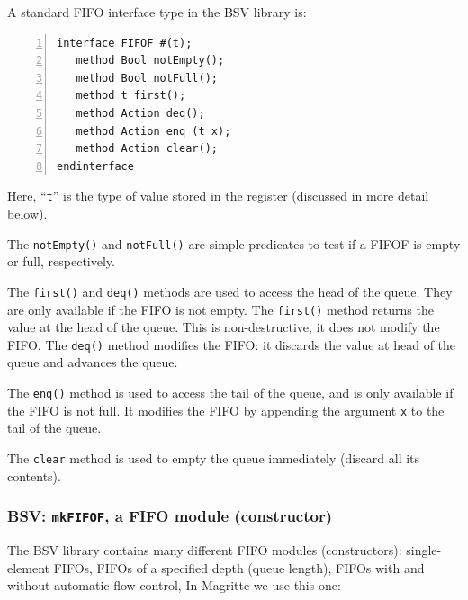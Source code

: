 
A standard FIFO interface type in the BSV library is:

\begin{Verbatim}[frame=single, numbers=left]
interface FIFOF #(t);
   method Bool notEmpty();
   method Bool notFull();
   method t first();
   method Action deq();
   method Action enq (t x);
   method Action clear();
endinterface
\end{Verbatim}

Here, ``\verb|t|'' is the type of value stored in the register
(discussed in more detail below).

The \verb|notEmpty()| and \verb|notFull()| are simple predicates to
test if a FIFOF is empty or full, respectively.

The \verb|first()| and \verb|deq()| methods are used to access the
head of the queue.  They are only available if the FIFO is not empty.
The \verb|first()| method returns the value at the head of the queue.
This is non-destructive, {\ie} it does not modify the FIFO.  The
\verb|deq()| method modifies the FIFO: it discards the value at head
of the queue and advances the queue.

The \verb|enq()| method is used to access the tail of the queue, and
is only available if the FIFO is not full.  It modifies the FIFO by
appending the argument \verb|x| to the tail of the queue.

The \verb|clear| method is used to empty the queue immediately
(discard all its contents).


\subsubsection{BSV: {\tt mkFIFOF}, a FIFO module (constructor)}



The BSV library contains many different FIFO modules (constructors):
single-element FIFOs, FIFOs of a specified depth (queue length), FIFOs
with and without automatic flow-control, {\etc} In Magritte we use
this one:


